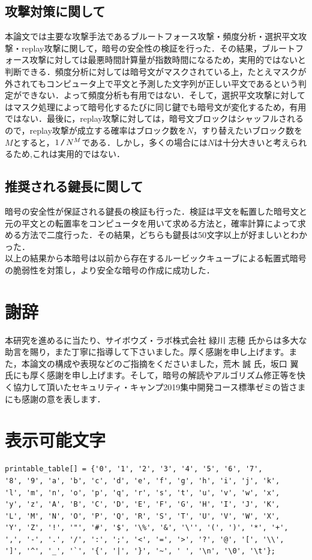 \documentclass[a4j,titlepage]{jsarticle}
\newcommand{\code}[1]{ \texttt{\detokenize{#1}} }
\begin{document}
\subsection{攻撃対策に関して}
本論文では主要な攻撃手法であるブルートフォース攻撃・頻度分析・選択平文攻撃・replay攻撃に関して，暗号の安全性の検証を行った．その結果，ブルートフォース攻撃に対しては最悪時間計算量が指数時間になるため，実用的ではないと判断できる．頻度分析に対しては暗号文がマスクされている上，たとえマスクが外されてもコンピュータ上で平文と予測した文字列が正しい平文であるという判定ができない．よって頻度分析も有用ではない．そして，選択平文攻撃に対してはマスク処理によって暗号化するたびに同じ鍵でも暗号文が変化するため，有用ではない．最後に，replay攻撃に対しては，暗号文ブロックはシャッフルされるので，replay攻撃が成立する確率はブロック数を\(N\)，すり替えたいブロック数を\(M\)とすると，\(1\,\code{/}\,N^M\)である．しかし，多くの場合には\(N\)は十分大きいと考えられるため,これは実用的ではない．

\subsection{推奨される鍵長に関して}
暗号の安全性が保証される鍵長の検証も行った．検証は平文を転置した暗号文と元の平文との転置率をコンピュータを用いて求める方法と，確率計算によって求める方法で二度行った．その結果，どちらも鍵長は50文字以上が好ましいとわかった．\\

以上の結果から本暗号は以前から存在するルービックキューブによる転置式暗号の脆弱性を対策し，より安全な暗号の作成に成功した．

\section{謝辞}
本研究を進めるに当たり、サイボウズ・ラボ株式会社 緑川 志穂 氏からは多大な助言を賜り，また丁寧に指導して下さいました。厚く感謝を申し上げます。また，本論文の構成や表現などのご指摘をくださいました，荒木 誠 氏，坂口 翼 氏にも厚く感謝を申し上げます。そして，暗号の解読やアルゴリズム修正等を快く協力して頂いたセキュリティ・キャンプ2019集中開発コース標準ゼミの皆さまにも感謝の意を表します．

\appendix
\section{表示可能文字}
\begin{verbatim}
printable_table[] = {'0', '1', '2', '3', '4', '5', '6', '7', 
'8', '9', 'a', 'b', 'c', 'd', 'e', 'f', 'g', 'h', 'i', 'j', 'k', 
'l', 'm', 'n', 'o', 'p', 'q', 'r', 's', 't', 'u', 'v', 'w', 'x', 
'y', 'z', 'A', 'B', 'C', 'D', 'E', 'F', 'G', 'H', 'I', 'J', 'K', 
'L', 'M', 'N', 'O', 'P', 'Q', 'R', 'S', 'T', 'U', 'V', 'W', 'X', 
'Y', 'Z', '!', '"', '#', '$', '\%', '&', '\'', '(', ')', '*', '+', 
',', '-', '.', '/', ':', ';', '<', '=', '>', '?', '@', '[', '\\', 
']', '^', '_', '`', '{', '|', '}', '~', ' ', '\n', '\0', '\t'};
\end{verbatim}
\end{document}
